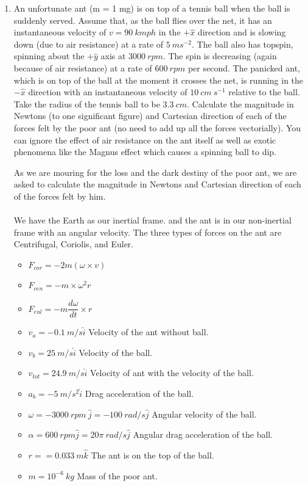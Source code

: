 \documentclass[fleqn]{article}
\begin{document}
\begin{enumerate}
    \item An unfortunate ant (m = 1 mg) is on top of a tennis ball when the ball is suddenly served. Assume that, as the ball flies over the net,
    it has an instantaneous velocity of $v=90 ~ kmph$ in the $+\hat{x}$ direction and is slowing down (due to air resistance) at a rate of
    $5 ~ ms^{-2}$. The ball also has topspin, spinning about the $+\hat{y}$ axis at $3000 ~ rpm$. The spin is decreasing (again because of air resistance) at a rate of
    $600 ~ rpm$ per second. The panicked ant, which is on top of the ball at the moment it crosses the net, is running in the $-\hat{x}$ direction with an
    instantaneous velocity of $10 ~ cm ~ s^{-1}$ relative to the ball. Take the radius of the tennis ball to be $3.3 ~ cm$. Calculate the magnitude in Newtons
    (to one significant figure) and Cartesian direction of each of the forces felt by the poor ant (no need to add up all the forces vectorially). You
    can ignore the effect of air resistance on the ant itself as well as exotic phenomena like the Magnus effect which causes a spinning ball to dip.

      \textcolor{hwColor}{
        As we are mouring for the loss and the dark destiny of the poor ant, we are asked to 
        calculate the magnitude in Newtons and Cartesian direction of each of the forces felt 
        by him. \\
        \\
        We have the Earth as our inertial frame. and the ant is in our non-inertial frame with an angular velocity.
        The three types of forces on the ant are Centrifugal, Coriolis, and Euler. 
        \begin{itemize}
          \item $F_{cor}=-2m \left(\omega \times v\right)$
          \item $F_{cen}=-m \times \omega^2 r$
          \item $F_{eul}=-m \dfrac{d \omega}{dt} \times r$
        \end{itemize}
      }

      \textcolor{hwColor}{
        \begin{itemize}
          \item $v_a=-0.1 ~ m/s \hat{i}$ Velocity of the ant without ball.
          \item $v_b=25 ~ m/s \hat{i}$ Velocity of the ball.
          \item $v_{tot}=24.9 ~ m/s \hat{i}$ Velocity of ant with the velocity of the ball.
          \item $a_b=-5 ~ m/s^2 \hat{i}$ Drag acceleration of the ball.
          \item $\omega=-3000 ~ rpm ~ \hat{j}=-100 ~ rad/s \hat{j}$ Angular velocity of the ball.
          \item $\alpha=600 ~ rpm \hat{j}=20 \pi ~ rad/s \hat{j}$ Angular drag acceleration of the ball.
          \item $r==0.033 ~ m \hat{k}$ The ant is on the top of the ball.
          \item $m=10^{-6} ~ kg$ Mass of the poor ant.   
        \end{itemize}
      }


\end{enumerate}
\end{document}
